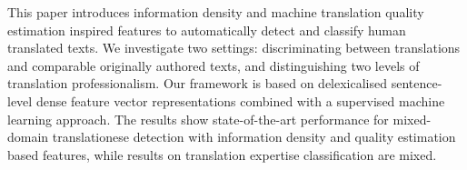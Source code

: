 This paper introduces information density and machine translation quality estimation inspired features to automatically detect and classify human translated texts. We investigate two settings: discriminating between translations and comparable originally authored texts, and distinguishing two levels of translation professionalism. Our framework is based on delexicalised sentence-level dense feature vector representations combined with a supervised machine learning approach. The results show state-of-the-art performance for mixed-domain translationese detection with information density and quality estimation based features, while results on translation expertise classification are mixed.
